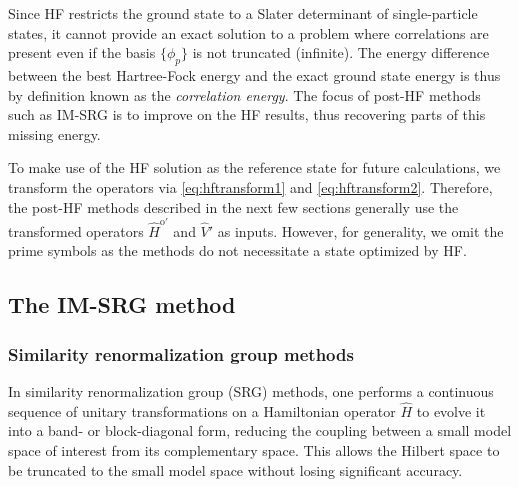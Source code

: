 Since HF restricts the ground state to a Slater determinant of single-particle
states, it cannot provide an exact solution to a problem where correlations
are present even if the basis $\{\phi_p\}$ is not truncated (infinite).  The
energy difference between the best Hartree-Fock energy and the exact ground
state energy is thus by definition known as the \textit{correlation energy}.
The focus of post-HF methods such as IM-SRG is to improve on the HF results,
thus recovering parts of this missing energy.

To make use of the HF solution as the reference state for future calculations, we transform the operators via \eqref{eq:hftransform1} and \eqref{eq:hftransform2}.  Therefore, the post-HF methods described in the next few sections generally use the transformed operators $\hat H^{\text{o} \prime}$ and $\hat V'$ as inputs.  However, for generality, we omit the prime symbols as the methods do not necessitate a state optimized by HF.

\subsection{The IM-SRG method}
\label{subsec:imsrgmethod}

\subsubsection{Similarity renormalization group methods}
\label{subsubsec:srgmethods}

In similarity renormalization group (SRG) methods, one performs a continuous
sequence of unitary transformations on a Hamiltonian operator $\hat H$ to
evolve it into a band- or block-diagonal form, reducing the coupling between a
small model space of interest from its complementary space.  This allows the
Hilbert space to be truncated to the small model space without losing
significant accuracy.

